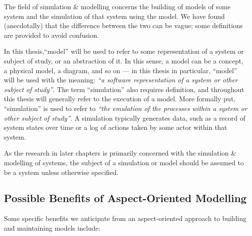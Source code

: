 The field of simulation \& modelling concerns the building of models of some
system and the simulation of that system using the model. We have found
(anecdotally) that the difference between the two can be vague; some definitions
are provided to avoid confusion.

In this thesis,``model'' will be used to refer to some representation of a
system or subject of study, or an abstraction of it. In this sense, a model can
be a concept, a physical model, a diagram, and so on --- in this thesis in
particular, ``model'' will be used with the meaning: \emph{``a software
  representation of a system or other subject of study''}. The term
``simulation'' also requires definition, and throughout this thesis will
generally refer to the execution of a model. More formally put, ``simulation''
is used to refer to \emph{``the emulation of the processes within a system or
  other subject of study''}. A simulation typically generates data, such as a
record of system states over time or a log of actions taken by some actor within
that system.

As the research in later chapters is primarily concerned with the simulation \&
modelling of \sociotechnical systems, the subject of a simulation or model
should be assumed to be a \sociotechnical system unless otherwise specified.


\subsection{Possible Benefits of Aspect-Oriented Modelling}
Some specific benefits we anticipate from an aspect-oriented approach to
building and maintaining models include:

